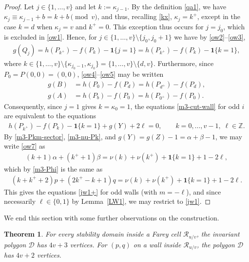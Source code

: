 \documentclass[11pt,reqno,tbtags,a4paper]{amsart}
\numberwithin{equation}{section}
\theoremstyle{plain}%
\newtheorem{theorem}{Theorem}[section]
\theoremstyle{definition}
\theoremstyle{remark}
\newcommand{\refL}[1]{Lemma~\ref{#1}}
\newcommand\set[1]{\ensuremath{\{#1\}}}
\newcommand\xcpar[1]{\{#1\}}
\newcommand\bbZ{\mathbb Z}
\newcounter{cc}
\newcommand\ga{\alpha}
\newcommand\gb{\beta}
\newcommand\kk{\kappa}
\newcommand\cD{\mathcal D}
\newcommand\cR{{\mathcal R}}
\newcommand\indic[1]{\boldsymbol1\xcpar{#1}}
\newcommand\kx{{k^+}}
\newcommand\kxx[1]{{#1^+}}
\newcommand\0{{\boldsymbol 0}}
\newcommand\1{{\boldsymbol 1}}
\begin{document}
\begin{proof}
Let $j\in\set{1,\dots,v}$ and let $k:=\kk_{j-1}$.
By the definition \eqref{qa1}, we have
$\kk_{j}\equiv \kk_{j-1}+b=k+b \pmod v$, and thus, recalling \eqref{kx},
$\kk_j=\kx$, except in the case $k=d$ when $\kk_j=v$ and $\kx=0$.
This exception thus occurs for $j=j_0$, which is excluded in \eqref{ow1}.
Hence, for $j\in\set{1,\dots,v}\setminus\set{j_0,j_0+1}$
we have by \eqref{ow2}--\eqref{ow3},
\begin{align}\label{ow6}
  g(Q_j) = h(P_\kx)-f(P_k) -\indic{j=1}
= h(P_\kx)-f(P_k) -\indic{k=1},
\end{align}
where $k\in\set{1,\dots,v}\setminus\set{\kk_{j_0-1},\kk_{j_0}}
=\set{1,\dots,v}\setminus\set{d,v}$.
Furthermore,
%
since
$P_0=P(0,0)=(0,0)$,
\eqref{ow4}--\eqref{ow5} may be written
\begin{align}\label{ow6B}
  g(B)&=h(P_0)-f(P_d) = h(P_{\kxx{d}})-f(P_d),
\\\label{ow6A}
g(A)&=h(P_b)-f(P_0)=h(P_{\kxx{0}})-f(P_0).
\end{align}
Consequently, since $j=1$ gives $k=\kk_0=1$, the equations
\eqref{m3-cut-wall} for odd $i$ are equivalent to the equations
\begin{align}\label{ow7}
  h(P_\kx)-f(P_k)-\indic{k=1}+g(Y)+2\ell=0,
\qquad k=0,\dots,v-1,\;\ell\in\bbZ.
\end{align}
By \eqref{m3-Pkm-sector}, \eqref{m3-nu-Pk},  and $g(Y)=g(Z)-1=\ga+\gb-1$, 
we may write \eqref{ow7} as
\begin{align}\label{ow8}
(k+1)\ga +(\kx+1)\gb =\nu(k)+\nu(\kx)+\indic{k=1}+1-2\ell,
%
%
\end{align}
which by \eqref{m3-Phi} is the same as
\begin{align}\label{ow9}
(k+\kx+2)p +(2\kx-k+1)q =\nu(k)+\nu(\kx)+\indic{k=1}+1-2\ell.
%
\end{align}
This gives the equations \eqref{jw1+} for odd walls (with $m=-\ell$), and
since necessarily $\ell\in\set{0,1}$ by \refL{LW1}, we may restrict to
\eqref{jw1}.
\end{proof}

We end this section with some further observations on the construction.

\begin{theorem}\label{Tm3-4v+3}
For every stability domain inside a Farey cell $\cR_{u/v}$, the invariant
polygon $\cD$ has $4v+3$ vertices.
For $(p,q)$ on a wall inside $\cR_{u/v}$, the polygon $\cD$ has $4v+2$
vertices. 
\end{theorem}
\end{document}
